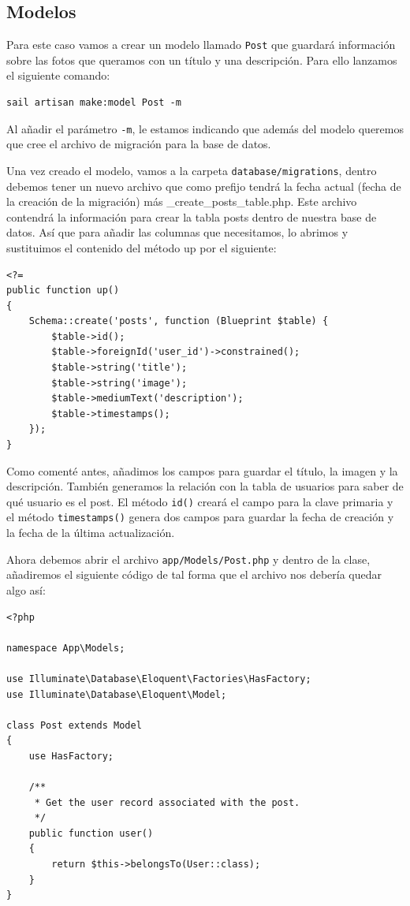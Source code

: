 \documentclass[11pt]{article}
\begin{document}
\subsection{Modelos}
\label{sec:org934d3a0}
Para este caso vamos a crear un modelo llamado \texttt{Post} que guardará
información sobre las fotos que queramos con un título y una
descripción. Para ello lanzamos el siguiente comando:
\begin{verbatim}
sail artisan make:model Post -m
\end{verbatim}

Al añadir el parámetro \texttt{-m}, le estamos indicando que además del modelo
queremos que cree el archivo de migración para la base de datos.

Una vez creado el modelo, vamos a la carpeta \texttt{database/migrations},
dentro debemos tener un nuevo archivo que como prefijo tendrá la fecha
actual (fecha de la creación de la migración) más
\_create\_posts\_table.php. Este archivo contendrá la información para
crear la tabla posts dentro de nuestra base de datos. Así que para
añadir las columnas que necesitamos, lo abrimos y sustituimos el
contenido del método up por el siguiente:

\begin{verbatim}
<?=
public function up()
{
    Schema::create('posts', function (Blueprint $table) {
        $table->id();
        $table->foreignId('user_id')->constrained();
        $table->string('title');
        $table->string('image');
        $table->mediumText('description');
        $table->timestamps();
    });
}
\end{verbatim}


Como comenté antes, añadimos los campos para guardar el título, la
imagen y la descripción. También generamos la relación con la tabla de
usuarios para saber de qué usuario es el post. El método \texttt{id()} creará
el campo para la clave primaria y el método \texttt{timestamps()} genera dos
campos para guardar la fecha de creación y la fecha de la última
actualización.

Ahora debemos abrir el archivo \texttt{app/Models/Post.php} y dentro de la
clase, añadiremos el siguiente código de tal forma que el archivo nos
debería quedar algo así:
\begin{verbatim}
<?php

namespace App\Models;

use Illuminate\Database\Eloquent\Factories\HasFactory;
use Illuminate\Database\Eloquent\Model;

class Post extends Model
{
    use HasFactory;

    /**
     * Get the user record associated with the post.
     */
    public function user()
    {
        return $this->belongsTo(User::class);
    }
}
\end{verbatim}
\end{document}
